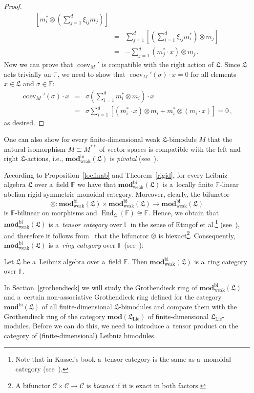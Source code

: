 \documentclass{jonasart}
\DeclareMathOperator{\bi}{bi}
\DeclareMathOperator{\coev}{coev}
\DeclareMathOperator{\End}{End}
\DeclareMathOperator{\lie}{Lie}
\DeclareMathOperator{\weak}{weak}
\newcommand{\ccal}{\mathcal{C}}
\newcommand{\fbb}{\mathbb{F}}
\newcommand{\fdmod}{\mathbf{mod}}
\newcommand{\lf}{\mathfrak{L}}
\begin{document}
\begin{proof}
\begin{eqnarray*}
			\left[m_i^*\otimes\left(\sum_{j=1}^d\xi_{ij}m_j\right)\right]\\
			& = & \sum_{j=1}^d\left[\left(\sum_{i=1}^d\xi_{ij}m_i^*\right)
			\otimes m_j\right]\\
			& = & -\sum_{j=1}^d (m_j^*\cdot x)\otimes m_j\,.
		\end{eqnarray*}
		Now we can prove that $\coev_M '$ is compatible with the right action of $\lf$. Since $\lf$ acts trivially on $\fbb$, we need to show that $\coev_M '(\sigma)
		\cdot x=0$ for all elements $x\in\lf$ and $\sigma\in\fbb$:
		\begin{eqnarray*}
			\coev_M '(\sigma)\cdot x & = & \sigma\left(\sum_{i=1}^d m_i^*\otimes m_i\right)\cdot x\\
			& = & \sigma\sum_{i=1}^d [(m_i^*\cdot x)\otimes m_i +m_i^*\otimes(m_i\cdot x)]=0\,,
		\end{eqnarray*}
		as desired.
	\end{proof}

	\begin{remark}\label{pivotal}
		{One can also show for every finite-dimensional weak $\lf$-bimodule
		$M$ that the natural isomorphism $M\cong M^{**}$ of vector spaces is compatible with the left and right $\lf$-actions, i.e., $\fdmod_{\weak}^{\bi}
		(\lf)$ is \emph{pivotal\/} (see~\cite[Definition 4.7.8]{EGNO}).}
	\end{remark}
	According to Proposition~\ref{locfinab} and Theorem~\ref{rigid}, for every
	Leibniz algebra $\lf$ over a~field $\fbb$ we have that $\fdmod_{\weak}^{\bi}
	(\lf)$ is a~locally finite $\fbb$-linear abelian rigid symmetric monoidal category. Moreover, clearly, the bifunctor
	\[
		\otimes:\fdmod_{\weak}^{\bi}(\lf)\times\fdmod_{\weak}^{\bi}(\lf)
		\to\fdmod_{\weak}^{\bi}(\lf)
	\]
	is $\fbb$-bilinear on morphisms and $\End_\lf(\fbb)\cong\fbb$. Hence, we obtain that $\fdmod_{\weak}^{\bi}(\lf)$ is a~\emph{tensor category} over $\fbb$ in the sense of Etingof et al.\footnote{Note that in Kassel's book a~tensor category is the same as a~monoidal category (see~\cite[Definition~XI.2.1]{K}).}
	(see~\cite[Definition 4.1.1]{EGNO}), and therefore it follows from~\cite[Proposition 4.2.1]{EGNO} that the bifunctor $\otimes$
	is biexact\footnote{A bifunctor $\ccal\times\ccal\to\ccal$ is
	\emph{biexact\/} if it is exact in both factors.}. Consequently,
	$\fdmod_{\weak}^{\bi}(\lf)$ is a~\emph{ring category\/} over
	$\fbb$ (see~\cite[Definition 4.2.3]{EGNO}):
	\begin{theorem}\label{ring}
		Let $\lf$ be a~Leibniz algebra over a~field $\fbb$. Then
		$\fdmod_{\weak}^{\bi}(\lf)$ is a~ring category over $\fbb$.
	\end{theorem}
	In Section~\ref{grothendieck} we will study the Grothendieck ring of
	$\fdmod_{\weak}^{\bi}(\lf)$ and a~certain non-associative Grothendieck ring defined for the category $\fdmod^{\bi}(\lf)$ of all finite-dimensional
	$\lf$-bimodules and compare them with the Grothendieck ring of the category $\fdmod(\lf_{\lie})$ of finite-dimensional $\lf_{\lie}$-modules. Before we can do this, we need to introduce a~tensor product on the category of (finite-dimensional) Leibniz bimodules.
\end{document}
